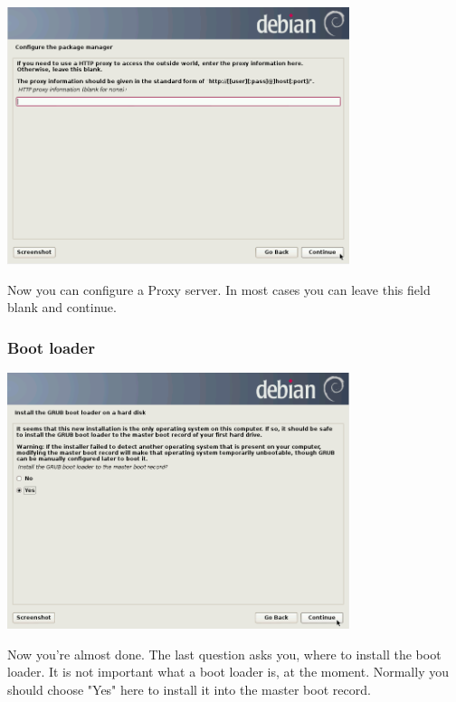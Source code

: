 \documentclass[a4paper,12pt,twoside]{article}
\begin{document}
\begin{minipage}{\linewidth}
    \centering
    \includegraphics[width=10cm]{efaLiveen-img/efaLiveen-img17.png}
    \label{fig:select_proxy}
\end{minipage}
\bigskip

Now you can configure a Proxy server. In most cases you can leave this
field blank and continue.


\subsubsection{Boot loader}
\label{sct:boot_loader}

\begin{minipage}{\linewidth}
    \centering
    \includegraphics[width=10cm]{efaLiveen-img/efaLiveen-img18.png}
    \label{fig:inst_grub}
\end{minipage}
\bigskip

Now you're almost done. The last question asks you,
where to install the boot loader. It is not important what a boot
loader is, at the moment. Normally you should choose
"Yes" here to install it into the master
boot record.
\end{document}
